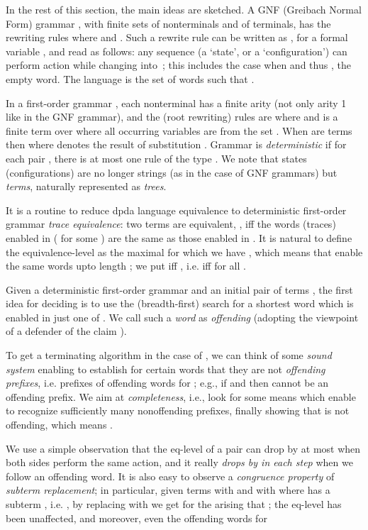 \documentclass[12pt]{article}
\begin{document}
In the rest of this section, the main ideas are sketched.
A GNF (Greibach Normal Form) grammar , with finite sets
 of nonterminals and  of terminals, 
has the rewriting rules 
 where  and .
Such a rewrite rule can be written as  , for a
formal variable , and read as follows: 
any sequence  (a `state', or a `configuration') can perform
action  while changing into  \,;
this includes the case  when  and thus , the
empty word.
The language  is the set of words  such that 
. 

In a first-order grammar , each nonterminal 
has a finite arity (not only arity 1 like in the GNF grammar), 
and the (root rewriting) rules are 
where  and  is a finite term over  where all
occurring variables are from the set .
When  are terms then 
  where 
 denotes the result of substitution
.
Grammar  is \emph{deterministic} if for each pair ,
 there is at most one rule of the type .
We note that states (configurations) are no longer strings (as in the
case of GNF grammars) but
\emph{terms}, naturally represented as \emph{trees}. 

It is a routine to reduce dpda language equivalence 
to deterministic first-order grammar \emph{trace equivalence}:
two terms  are equivalent, ,
iff the words (traces)  enabled in 
( for some ) are the same as those enabled in .
It is natural to define the equivalence-level
  as the maximal  for which we have 
, which means that 
 enable the same words upto length ; 
we put  iff , i.e. iff  
 for all .

Given a deterministic first-order grammar
 and an initial pair of terms ,  the first idea for
deciding  
is to use the (breadth-first) search for a
shortest 
word  which is enabled in just one of .
We call such a
\emph{word} as \emph{offending} (adopting the viewpoint of a
defender of the claim ).

To get a
terminating algorithm in the case of ,
we can think of some \emph{sound system} enabling to establish for certain words
 that they are not \emph{offending prefixes}, i.e.
prefixes of offending words for  ; e.g., if 
and  then  cannot be an offending prefix.
We aim at \emph{completeness},
i.e., look for some means which enable to recognize sufficiently many
nonoffending prefixes, finally showing that  is not
offending, which means  .

We use a simple observation that
the eq-level of a pair  can drop by at most  when both sides
perform the same
action, 
and it 
really \emph{drops by  in each step} when we follow an offending
word.
It is also easy to observe a \emph{congruence property} of
\emph{subterm replacement}; in particular, given terms  with 
 and  with  
where  has a subterm , i.e. ,
by replacing  with  we get for the arising  
that ; 
the eq-level has been unaffected, and moreover, even the offending words for
 
\end{document}

